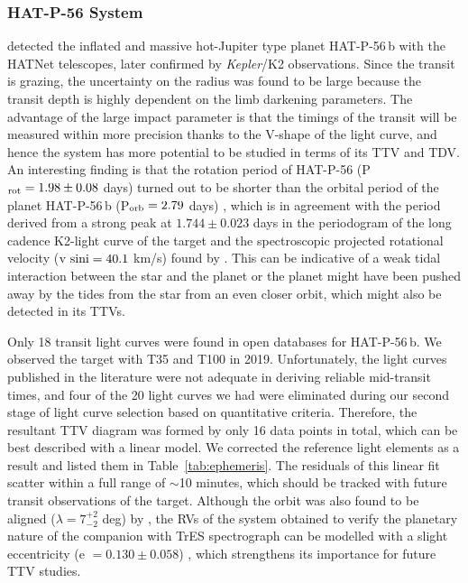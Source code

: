 \documentclass[a4paper,fleqn,usenatbib]{mnras}
\begin{document}
\subsubsection{HAT-P-56 System}
\cite{2015AJ....150...85H} detected the inflated and massive hot-Jupiter type planet HAT-P-56\,b with the HATNet telescopes, later confirmed by \textit{Kepler}/K2 observations. Since the transit is grazing, the uncertainty on the radius was found to be large because the transit depth is highly dependent on the limb darkening parameters. The advantage of the large impact parameter is that the timings of the transit will be measured within more precision thanks to the V-shape of the light curve, and hence the system has more potential to be studied in terms of its TTV and TDV. An interesting finding is that the rotation period of HAT-P-56 (P$_{\rm rot} = 1.98 \pm 0.08$ days) turned out to be shorter than the orbital period of the planet HAT-P-56\,b (P$_{\rm orb} = 2.79$ days) \citep{2016MNRAS.460.3376Z}, which is in agreement with the period derived from a strong peak at $1.744 \pm 0.023$ days in the periodogram of the long cadence K2-light curve of the target and the spectroscopic projected rotational velocity (${\rm v~sini} = 40.1$ km/s) found by \citet{2015AJ....150...85H}. This can be indicative of a weak tidal interaction between the star and the planet or the planet might have been pushed away by the tides from the star from an even closer orbit, which might also be detected in its TTVs.

Only 18 transit light curves were found in open databases for HAT-P-56\,b. We observed the target with T35 and T100 in 2019. Unfortunately, the light curves published in the literature were not adequate in deriving reliable mid-transit times, and four of the 20 light curves we had were eliminated during our second stage of light curve selection based on quantitative criteria. Therefore, the resultant TTV diagram was formed by only 16 data points in total, which can be best described with a linear model. We corrected the reference light elements as a result and listed them in Table~\ref{tab:ephemeris}. The residuals of this linear fit scatter within a full range of $\sim$10 minutes, which should be tracked with future transit observations of the target. Although the orbit was also found to be aligned ($\lambda = 7^{+2}_{-2}$ deg) by \citet{2016MNRAS.460.3376Z}, the RVs of the system obtained to verify the planetary nature of the companion with TrES spectrograph can be modelled with a slight eccentricity (e $ = 0.130 \pm 0.058$) \citep{2015AJ....150...85H}, which strengthens its importance for future TTV studies.
\end{document}
